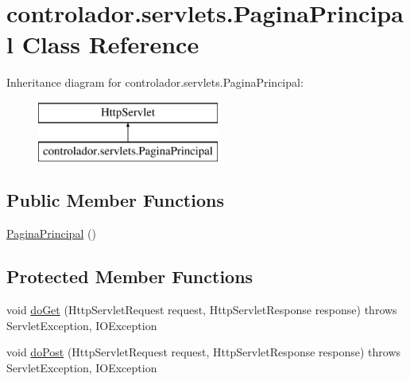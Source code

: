 \hypertarget{classcontrolador_1_1servlets_1_1PaginaPrincipal}{}\section{controlador.\+servlets.\+Pagina\+Principal Class Reference}
\label{classcontrolador_1_1servlets_1_1PaginaPrincipal}
Inheritance diagram for controlador.\+servlets.\+Pagina\+Principal\+:\begin{figure}[H]
\begin{center}
\leavevmode
\includegraphics[height=2.000000cm]{classcontrolador_1_1servlets_1_1PaginaPrincipal}
\end{center}
\end{figure}
\subsection*{Public Member Functions}
\begin{DoxyCompactItemize}
\item 
\hyperlink{classcontrolador_1_1servlets_1_1PaginaPrincipal_a81b4ce3852074660b6c49ad8f9381db2}{Pagina\+Principal} ()
\end{DoxyCompactItemize}
\subsection*{Protected Member Functions}
\begin{DoxyCompactItemize}
\item 
void \hyperlink{classcontrolador_1_1servlets_1_1PaginaPrincipal_a1ebdc5a022ce170f3648fe141f9e1480}{do\+Get} (Http\+Servlet\+Request request, Http\+Servlet\+Response response)  throws Servlet\+Exception, I\+O\+Exception 
\item 
void \hyperlink{classcontrolador_1_1servlets_1_1PaginaPrincipal_ae33ae6fe9a5e9b39a5d9d58041b8b3ad}{do\+Post} (Http\+Servlet\+Request request, Http\+Servlet\+Response response)  throws Servlet\+Exception, I\+O\+Exception 
\end{DoxyCompactItemize}
